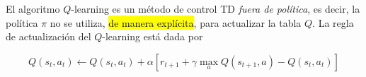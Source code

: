 	
	
	
	


El algoritmo $Q$-learning \cite{watkins1992q} es un método de control TD \textit{fuera de política}, es decir,
la política $\pi$ no se utiliza, \hl{de manera explícita}, para actualizar la tabla $Q$. 
La regla de actualización del $Q$-learning está dada por 

\begin{equation}\label{eq:q-learning-update}
Q(s_t, a_t) \leftarrow Q(s_t, a_t) + \alpha[r_{t+1} + \gamma \max_a Q(s_{t+1}, a) - Q(s_t, a_t)]
\end{equation}



